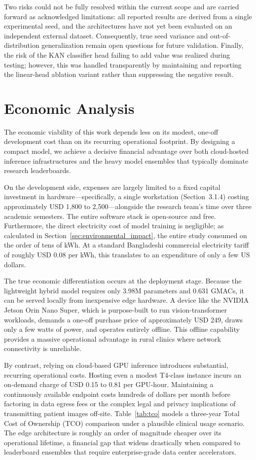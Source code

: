 Two risks could not be fully resolved within the current scope and are carried forward as acknowledged limitations: all reported results are derived from a single experimental seed, and the architectures have not yet been evaluated on an independent external dataset. Consequently, true seed variance and out-of-distribution generalization remain open questions for future validation. Finally, the risk of the KAN classifier head failing to add value was realized during testing; however, this was handled transparently by maintaining and reporting the linear-head ablation variant rather than suppressing the negative result.

\section{Economic Analysis}

The economic viability of this work depends less on its modest, one-off development cost than on its recurring operational footprint. By designing a compact model, we achieve a decisive financial advantage over both cloud-hosted inference infrastructures and the heavy model ensembles that typically dominate research leaderboards. 

On the development side, expenses are largely limited to a fixed capital investment in hardware—specifically, a single workstation (Section~3.1.4) costing approximately USD 1{,}800 to 2{,}500—alongside the research team's time over three academic semesters. The entire software stack is open-source and free. Furthermore, the direct electricity cost of model training is negligible; as calculated in Section~\ref{sec:environmental_impact}, the entire study consumed on the order of tens of kWh. At a standard Bangladeshi commercial electricity tariff of roughly USD 0.08 per kWh, this translates to an expenditure of only a few US dollars.

The true economic differentiation occurs at the deployment stage. Because the lightweight hybrid model requires only 3.98M parameters and 0.631 GMACs, it can be served locally from inexpensive edge hardware. A device like the NVIDIA Jetson Orin Nano Super, which is purpose-built to run vision-transformer workloads, demands a one-off purchase price of approximately USD 249, draws only a few watts of power, and operates entirely offline. This offline capability provides a massive operational advantage in rural clinics where network connectivity is unreliable. 

By contrast, relying on cloud-based GPU inference introduces substantial, recurring operational costs. Hosting even a modest T4-class instance incurs an on-demand charge of USD 0.15 to 0.81 per GPU-hour. Maintaining a continuously available endpoint costs hundreds of dollars per month before factoring in data egress fees or the complex legal and privacy implications of transmitting patient images off-site. Table~\ref{tab:tco} models a three-year Total Cost of Ownership (TCO) comparison under a plausible clinical usage scenario. The edge architecture is roughly an order of magnitude cheaper over its operational lifetime, a financial gap that widens drastically when compared to leaderboard ensembles that require enterprise-grade data center accelerators.

